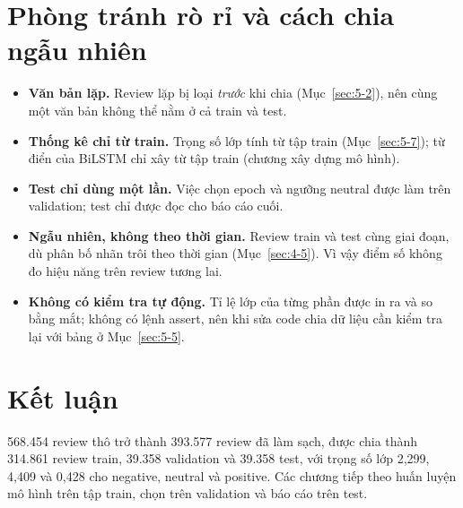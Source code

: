 \section{Phòng tránh rò rỉ và cách chia ngẫu nhiên}
\label{sec:5-8}

\begin{itemize}
    \item \textbf{Văn bản lặp.} Review lặp bị loại \emph{trước} khi chia (Mục~\ref{sec:5-2}), nên cùng một văn bản không thể nằm ở cả train và test.
    \item \textbf{Thống kê chỉ từ train.} Trọng số lớp tính từ tập train (Mục~\ref{sec:5-7}); từ điển của BiLSTM chỉ xây từ tập train (chương xây dựng mô hình).
    \item \textbf{Test chỉ dùng một lần.} Việc chọn epoch và ngưỡng neutral được làm trên validation; test chỉ được đọc cho báo cáo cuối.
    \item \textbf{Ngẫu nhiên, không theo thời gian.} Review train và test cùng giai đoạn, dù phân bố nhãn trôi theo thời gian (Mục~\ref{sec:4-5}). Vì vậy điểm số không đo hiệu năng trên review tương lai.
    \item \textbf{Không có kiểm tra tự động.} Tỉ lệ lớp của từng phần được in ra và so bằng mắt; không có lệnh assert, nên khi sửa code chia dữ liệu cần kiểm tra lại với bảng ở Mục~\ref{sec:5-5}.
\end{itemize}

\section{Kết luận}
\label{sec:5-9}

568.454 review thô trở thành 393.577 review đã làm sạch, được chia thành 314.861 review train, 39.358 validation và 39.358 test, với trọng số lớp 2,299, 4,409 và 0,428 cho negative, neutral và positive. Các chương tiếp theo huấn luyện mô hình trên tập train, chọn trên validation và báo cáo trên test.
